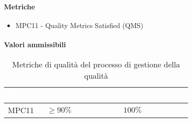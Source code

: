 \paragraph{Metriche}
\begin{itemize}
	\item MPC11 - Quality Metrics Satisfied (QMS)
\end{itemize}

\paragraph{Valori ammissibili}
{
\renewcommand{\arraystretch}{1.5}
\centering
\begin{longtable}{C{2.5cm} C{4cm} C{4cm}}
\textcolor{white}{\textbf{Metrica}}&
\textcolor{white}{\textbf{Valori accettabile}}&
\textcolor{white}{\textbf{Valore ottimale}}\\	
\endhead
\endfoot
{}\caption{Metriche di qualità del processo di gestione della qualità}
\endlastfoot

MPC11 & $\geq 90\% $  & $ 100 \% $ \\

\end{longtable}
}

